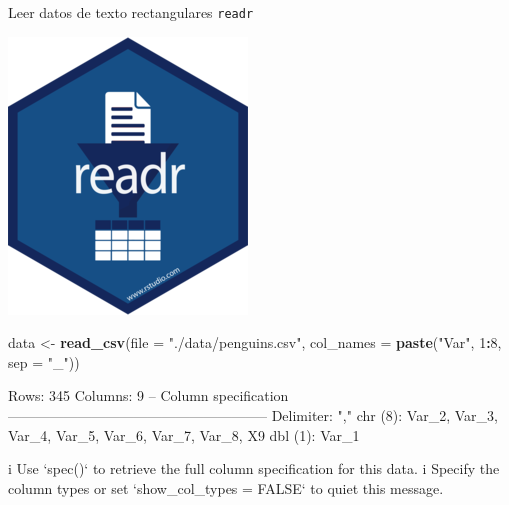 \documentclass[
  ignorenonframetext,
  aspectratio=169]{beamer}
\newenvironment{Shaded}{\begin{snugshade}}{\end{snugshade}}
\newcommand{\AttributeTok}[1]{\textcolor[rgb]{0.13,0.29,0.53}{#1}}
\newcommand{\DecValTok}[1]{\textcolor[rgb]{0.00,0.00,0.81}{#1}}
\newcommand{\FunctionTok}[1]{\textcolor[rgb]{0.13,0.29,0.53}{\textbf{#1}}}
\newcommand{\NormalTok}[1]{#1}
\newcommand{\OtherTok}[1]{\textcolor[rgb]{0.56,0.35,0.01}{#1}}
\newcommand{\SpecialCharTok}[1]{\textcolor[rgb]{0.81,0.36,0.00}{\textbf{#1}}}
\newcommand{\StringTok}[1]{\textcolor[rgb]{0.31,0.60,0.02}{#1}}
\let\oldverbatim\verbatim
\let\endoldverbatim\endverbatim
\renewenvironment{verbatim}{\tiny\oldverbatim}{\endoldverbatim}
\begin{document}
\begin{frame}[fragile]{Leer datos de texto rectangulares \texttt{readr}}
\label{leer-datos-de-texto-rectangulares-readr-5}
\begin{flushright}\includegraphics[width=0.05\linewidth]{Imgs/logo_readr} \end{flushright}

\begin{Shaded}
\begin{Highlighting}[]
\NormalTok{data }\OtherTok{\textless{}{-}} \FunctionTok{read\_csv}\NormalTok{(}\AttributeTok{file =} \StringTok{"./data/penguins.csv"}\NormalTok{,}
                 \AttributeTok{col\_names =} \FunctionTok{paste}\NormalTok{(}\StringTok{"Var"}\NormalTok{, }\DecValTok{1}\SpecialCharTok{:}\DecValTok{8}\NormalTok{, }\AttributeTok{sep =} \StringTok{"\_"}\NormalTok{))}
\end{Highlighting}
\end{Shaded}

\begin{verbatim}
Rows: 345 Columns: 9
-- Column specification --------------------------------------------------------
Delimiter: ","
chr (8): Var_2, Var_3, Var_4, Var_5, Var_6, Var_7, Var_8, X9
dbl (1): Var_1

i Use `spec()` to retrieve the full column specification for this data.
i Specify the column types or set `show_col_types = FALSE` to quiet this message.
\end{verbatim}
\end{frame}
\end{document}
